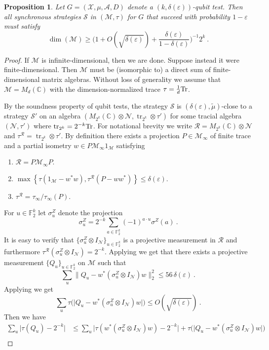 \documentclass[11pt]{article}
\newtheorem{proposition}[theorem]{Proposition}
\theoremstyle{definition}
\newcommand{\strategy}{\mathscr{S}}
\newcommand{\Tr}{\mbox{\rm Tr}}
\newcommand{\C}{\ensuremath{\mathbb{C}}}
\newcommand{\F}{\ensuremath{\mathbb{F}}}
\newcommand{\mA}{\ensuremath{\mathcal{A}}}
\newcommand{\mM}{\ensuremath{\mathcal{M}}}
\newcommand{\mR}{\ensuremath{\mathcal{R}}}
\newcommand{\mX}{\ensuremath{\mathcal{X}}}
\newcommand{\eps}{\varepsilon}
\newcommand{\mN}{\mathcal{N}}
\DeclareMathOperator{\tr}{tr}
\begin{document}
\begin{proposition}
\label{prop:dim-test}
Let $G = (\mX,\mu,\mA,D)$ denote a $(k,\delta(\eps))$-qubit test. Then all synchronous strategies $\strategy$ in $(\mM,\tau)$ for $G$ that succeed with probability $1 - \eps$ must satisfy 
\[
\dim(\mM) \geq \Big( 1 + O(\sqrt{\delta(\eps)}) + \frac{\delta(\eps)}{1 - \delta(\eps)}\Big)^{-1} 2^k~.
\]
\end{proposition}
\begin{proof}
If $\mM$ is infinite-dimensional, then we are done. Suppose instead it were finite-dimensional. Then $\mM$ must be (isomorphic to) a direct sum of finite-dimensional matrix algebras. Without loss of generality we assume that $\mM = M_{d}(\C)$ with the dimension-normalized trace $\tau = \frac{1}{d} \Tr$. 

By the soundness property of qubit tests, the strategy $\strategy$ is $(\delta(\eps),\tilde{\mu})$-close to a strategy $\strategy'$ on an algebra $(M_{2^k}(\C) \otimes \mN,\tr_{2^k} \otimes \tau')$ for some tracial algebra $(\mN,\tau')$ where $\tr_{2^k} = 2^{-k} \Tr$. For notational brevity we write $\mR = M_{2^k}(\C) \otimes \mN$ and $\tau^{\mR} = \tr_{2^k} \otimes \tau'$. By definition there exists a projection $P \in \mM_\infty$ of finite trace and a partial isometry $w \in P \mM_\infty 1_\mM$ satisfying
\begin{enumerate}
	\item $\mR = P \mM_\infty P$. 
	\item $\max \left \{ \tau(1_\mM - w^* w), \tau^{\mR} (P - w w^*) \right \} \leq \delta(\eps)$.
	\item $\tau^{\mR} = \tau_\infty/\tau_\infty(P)$.
\end{enumerate}
For $u \in \F_2^k$ let $\sigma^Z_u$ denote the projection
\[
	\sigma^Z_u = 2^{-k} \sum_{a \in \F_2^k} (-1)^{a \cdot u} \sigma^Z(a)~.
\]
It is easy to verify that $\{\sigma^Z_u \otimes I_\mN \}_{u \in \F_2^k}$ is a projective measurement in $\mR$ and furthermore $\tau^{\mR}(\sigma^Z_u \otimes I_\mN) = 2^{-k}$. Applying  we get that there exists a projective measurement $\{Q_u\}_{u \in \F_2^k}$ on $\mM$ such that
\[
	\sum_u \| Q_u - w^* (\sigma^Z_u \otimes I_\mN) w \|_2^2 \leq 56\, \delta(\eps)~.
\]
Applying  we get
\[
	\sum_u \tau \Big ( \Big| Q_u - w^* (\sigma^Z_u \otimes I_\mN) w\Big| \Big) \leq O(\sqrt{\delta(\eps)})~.
\]
Then we have
\begin{align*}
	\sum_u \Big| \tau(Q_u) - 2^{-k} \Big| &\leq \sum_u \Big | \tau(w^* (\sigma^Z_u \otimes I_\mN) w) - 2^{-k} \Big| + \tau \Big ( \Big| Q_u - w^* (\sigma^Z_u \otimes I_\mN) w\Big| \Big) \\

\end{align*}
\end{proof}
\end{document}
